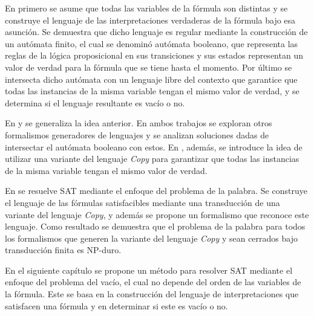 En \cite{aCFSAT} primero se asume que todas las variables de la fórmula son distintas y se construye el lenguaje de las interpretaciones verdaderas de la fórmula bajo esa asunción. Se demuestra que dicho lenguaje es regular mediante la construcción de un autómata finito, el cual se denominó autómata booleano, que representa las reglas de la lógica proposicional en sus transiciones y sus estados representan un valor de verdad para la fórmula que se tiene hasta el momento. Por último se intersecta dicho autómata con un lenguaje libre del contexto que garantice que todas las instancias de la misma variable tengan el mismo valor de verdad, y se determina si el lenguaje resultante es vacío o no.

En \cite{aSRCSAT} y \cite{MSAT} se generaliza la idea anterior. En ambos trabajos se exploran otros formalismos generadores de lenguajes y se analizan soluciones dadas de intersectar el autómata booleano con estos. En \cite{MSAT}, además, se introduce la idea de utilizar una variante del lenguaje \textit{Copy} para garantizar que todas las instancias de la misma variable tengan el mismo valor de verdad.

En \cite{RCGSAT} se resuelve SAT mediante el enfoque del problema de la palabra. Se construye el lenguaje de las fórmulas satisfacibles mediante una transducción de una variante del lenguaje \textit{Copy}, y además se propone un formalismo que reconoce este lenguaje. Como resultado se demuestra que el problema de la palabra para todos los formalismos que generen la variante del lenguaje \textit{Copy} y sean cerrados bajo transducción finita es NP-duro.

En el siguiente capítulo se propone un método para resolver SAT mediante el enfoque del problema del vacío, el cual no depende del orden de las variables de la fórmula. Este se basa en la construcción del lenguaje de interpretaciones que satisfacen una fórmula y en determinar si este es vacío o no.